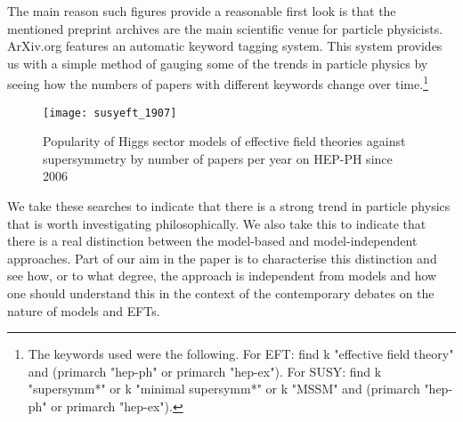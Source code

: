 The main reason such figures provide a reasonable first look is that the mentioned preprint archives are the main scientific venue for particle physicists.
ArXiv.org features an automatic keyword tagging system.
This system provides us with a simple method of gauging some of the trends in particle physics by seeing how the numbers of papers with different keywords change over time.\footnote{The keywords used were the following. For EFT: find k "effective field theory" and (primarch "hep-ph" or primarch "hep-ex"). For SUSY: find k "supersymm*" or k "minimal supersymm*" or k "MSSM" and (primarch "hep-ph" or primarch "hep-ex").} 
\begin{figure}[ht] \label{lineplot}
	\begin{center}
	\texttt{[image: susyeft\_1907]}
	\caption{Popularity of Higgs sector models of effective field theories against supersymmetry by number of papers per year on HEP-PH since 2006}
	\end{center}
\end{figure}
We take these searches to indicate that there is a strong trend in particle physics that is worth investigating philosophically.
We also take this to indicate that there is a real distinction between the model-based and model-independent approaches. 
Part of our aim in the paper is to characterise this distinction and see how, or to what degree, the approach is independent from models and how one should understand this in the context of the contemporary debates on the nature of models {\MSnote and EFTs}.
